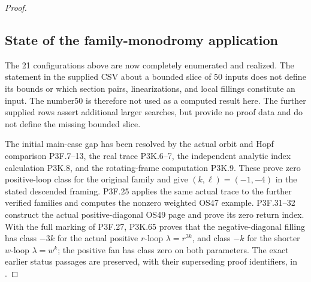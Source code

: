 \begin{proof}
\subsection{State of the family-monodromy application}\label{state-of-the-family-monodromy-application}

The 21 configurations above are now completely enumerated and realized. The statement in the supplied CSV about a bounded slice of 50 inputs does not define its bounds or which section pairs, linearizations, and local fillings constitute an input. The number50 is therefore not used as a computed result here. The further supplied rows assert additional larger searches, but provide no proof data and do not define the missing bounded slice.

The initial main-case gap has been resolved by the actual orbit and Hopf comparison P3F.7--13, the real trace P3K.6--7, the independent analytic index calculation P3K.8, and the rotating-frame computation P3K.9. These prove zero positive-loop class for the original family and give \((k,\ell)=(-1,-4)\) in the stated descended framing. P3F.25 applies the same actual trace to the further verified families and computes the nonzero weighted OS47 example. P3F.31--32 construct the actual positive-diagonal OS49 page and prove its zero return index. With the full marking of P3F.27, P3K.65 proves that the negative-diagonal filling has class \(-3k\) for the actual positive \(r\)-loop \(\lambda=r^{3k}\), and class \(-k\) for the shorter \(w\)-loop \(\lambda=w^k\); the positive fan has class zero on both parameters. The exact earlier status passages are preserved, with their superseding proof identifiers, in .
\end{proof}
